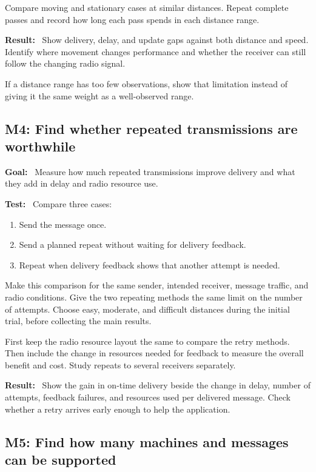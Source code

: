 \documentclass[11pt,a4paper]{article}
\newcommand{\field}[1]{\textbf{#1:}~}
\begin{document}
Compare moving and stationary cases at similar distances. Repeat complete
passes and record how long each pass spends in each distance range.

\field{Result} Show delivery, delay, and update gaps against both distance and
speed. Identify where movement changes performance and whether the receiver
can still follow the changing radio signal.

If a distance range has too few observations, show that limitation instead
of giving it the same weight as a well-observed range.

\subsection{M4: Find whether repeated transmissions are worthwhile}

\field{Goal} Measure how much repeated transmissions improve delivery and what
they add in delay and radio resource use.

\field{Test} Compare three cases:
\begin{enumerate}
  \item Send the message once.
  \item Send a planned repeat without waiting for delivery feedback.
  \item Repeat when delivery feedback shows that another attempt is needed.
\end{enumerate}

Make this comparison for the same sender, intended receiver, message traffic,
and radio conditions. Give the two repeating methods the same limit on the
number of attempts. Choose easy, moderate, and difficult distances during
the initial trial, before collecting the main results.

First keep the radio resource layout the same to compare the retry methods.
Then include the change in resources needed for feedback to measure the
overall benefit and cost. Study repeats to several receivers separately.

\field{Result} Show the gain in on-time delivery beside the change in delay,
number of attempts, feedback failures, and resources used per delivered
message. Check whether a retry arrives early enough to help the application.

\subsection{M5: Find how many machines and messages can be supported}
\end{document}
